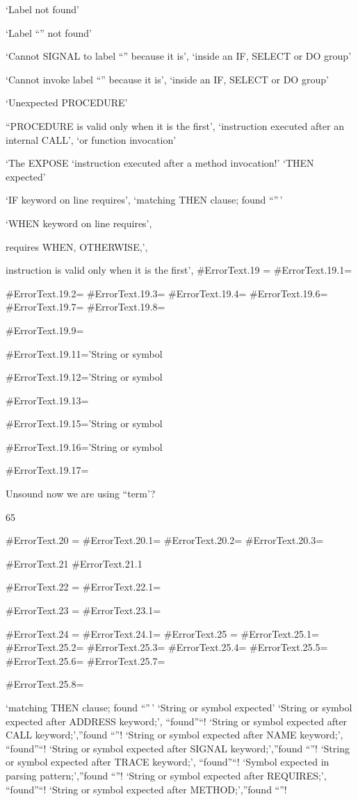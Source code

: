 `Label not found'

`Label ``'' not found'

`Cannot SIGNAL to label ``'' because it is', `inside an IF, SELECT or DO
group'

`Cannot invoke label ``'' because it is', `inside an IF, SELECT or DO
group'

`Unexpected PROCEDURE'

``PROCEDURE is valid only when it is the first', `instruction executed
after an internal CALL', `or function invocation'

`The EXPOSE `instruction executed after a method invocation!' `THEN
expected'

`IF keyword on line requires', `matching THEN clause; found ``''\,'

`WHEN keyword on line requires',

requires WHEN, OTHERWISE,',

instruction is valid only when it is the first', \#ErrorText.19 =
\#ErrorText.19.1=

\#ErrorText.19.2= \#ErrorText.19.3= \#ErrorText.19.4= \#ErrorText.19.6=
\#ErrorText.19.7= \#ErrorText.19.8=

\#ErrorText.19.9=

\#ErrorText.19.11='String or symbol

\#ErrorText.19.12='String or symbol

\#ErrorText.19.13=

\#ErrorText.19.15='String or symbol

\#ErrorText.19.16='String or symbol

\#ErrorText.19.17=

Unsound now we are using ``term'?

65

\#ErrorText.20 = \#ErrorText.20.1= \#ErrorText.20.2= \#ErrorText.20.3=

\#ErrorText.21 \#ErrorText.21.1

\#ErrorText.22 = \#ErrorText.22.1=

\#ErrorText.23 = \#ErrorText.23.1=

\#ErrorText.24 = \#ErrorText.24.1= \#ErrorText.25 = \#ErrorText.25.1=
\#ErrorText.25.2= \#ErrorText.25.3= \#ErrorText.25.4= \#ErrorText.25.5=
\#ErrorText.25.6= \#ErrorText.25.7=

\#ErrorText.25.8=

`matching THEN clause; found ``''\,' `String or symbol expected' `String
or symbol expected after ADDRESS keyword;', ``found''``! `String or
symbol expected after CALL keyword;',''found ``''! `String or symbol
expected after NAME keyword;', ``found''``! `String or symbol expected
after SIGNAL keyword;',''found ``''! `String or symbol expected after
TRACE keyword;', ``found''``! `Symbol expected in parsing
pattern;',''found ``''! `String or symbol expected after REQUIRES;',
``found''``! `String or symbol expected after METHOD;',''found ``''!

